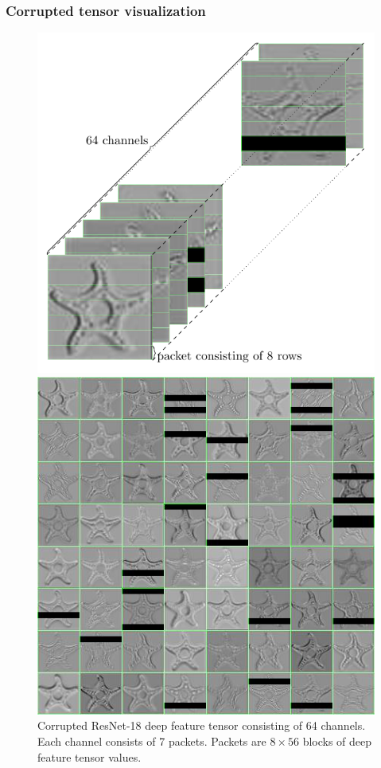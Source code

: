 \documentclass{beamer}
\begin{document}
\begin{frame}
	\frametitle{Corrupted tensor visualization}
	\begin{figure}
		\begin{minipage}{.48\textwidth}
			\includegraphics[width=\linewidth]{tensorviz4.pdf}
			\caption{Corrupted ResNet-18 deep feature tensor consisting of 64 channels. Each channel consists of 7 packets. Packets are $8 \times 56$ blocks of deep feature tensor values.}
		\end{minipage}\hfill
		\begin{minipage}{.48\textwidth}
			\includegraphics[width=\linewidth]{tiledgridtensor.jpg}

\end{minipage}
\end{figure}
\end{frame}
\end{document}
